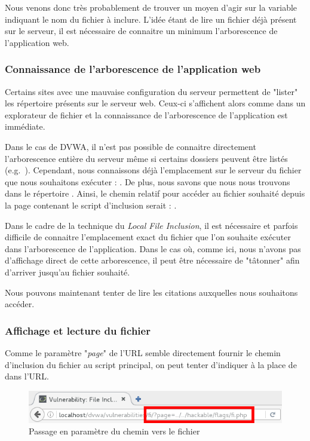 Nous venons donc très probablement de trouver un moyen d'agir sur la variable indiquant le nom du fichier à inclure. L'idée étant de lire un fichier déjà présent sur le serveur, il est nécessaire de connaitre un minimum l'arborescence de l'application web. 

\subsubsection{Connaissance de l'arborescence de l'application web}
\label{arb}

Certains sites avec une mauvaise configuration du serveur permettent de "lister" les répertoire présents sur le serveur web. Ceux-ci s'affichent alors comme dans un explorateur de fichier et la connaissance de l'arborescence de l'application est immédiate.

Dans le cas de DVWA, il n'est pas possible de connaitre directement l'arborescence entière du serveur même si certains dossiers peuvent être listés (e.g.\ ). Cependant, nous connaissons déjà l'emplacement sur le serveur du fichier que nous souhaitons exécuter : . De plus, nous savons que nous nous trouvons dans le répertoire . Ainsi, le chemin relatif pour accéder au fichier souhaité depuis la page contenant le script d'inclusion serait : .

Dans le cadre de la technique du \textit{Local File Inclusion}, il est nécessaire et parfois difficile de connaitre l'emplacement exact du fichier que l'on souhaite exécuter dans l'arborescence de l'application. Dans le cas où, comme ici, nous n'avons pas d'affichage direct de cette arborescence, il peut être nécessaire de "tâtonner" afin d'arriver jusqu'au fichier souhaité.

Nous pouvons maintenant tenter de lire les citations auxquelles nous souhaitons accéder.

\subsubsection{Affichage et lecture du fichier}


Comme le paramètre "\textit{page}" de l'URL semble directement fournir le chemin d'inclusion du fichier au script principal, on peut tenter d'indiquer  à la place de  dans l'URL.

\begin{figure}[!h]
\begin{center}
\includegraphics[scale=.6]{images/fi3.png}

\caption{Passage en paramètre du chemin vers le fichier}
\label{fi_dvwa3}
\end{center}
\end{figure}


